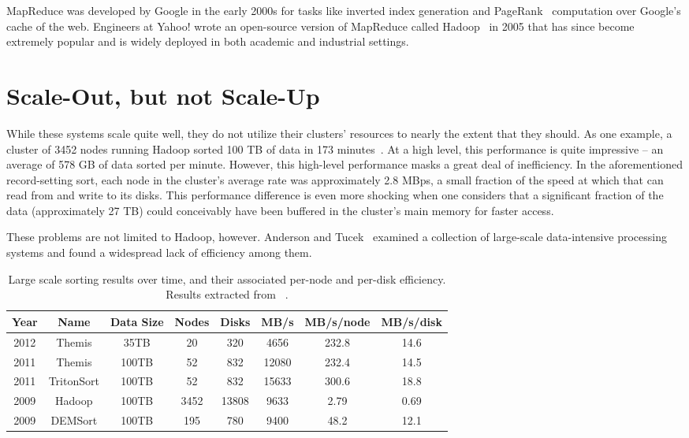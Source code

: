 MapReduce was developed by Google in the early 2000s for tasks like inverted
index generation and PageRank~\cite{pagerank} computation over Google's cache
of the web. Engineers at Yahoo! wrote an open-source version of MapReduce
called Hadoop~\cite{hadoop} in 2005 that has since become extremely popular and
is widely deployed in both academic and industrial settings.

\section{Scale-Out, but not Scale-Up}

While these systems scale quite well, they do not utilize their clusters'
resources to nearly the extent that they should. As one example, a cluster of
3452 nodes running Hadoop sorted 100 TB of data in 173
minutes~\cite{hadoop-sort-2009}. At a high level, this performance is quite
impressive -- an average of 578 GB of data sorted per minute. However, this
high-level performance masks a great deal of inefficiency. In the
aforementioned record-setting sort, each node in the cluster's average rate was
approximately 2.8 MBps, a small fraction of the speed at which that can read
from and write to its disks. This performance difference is even more shocking
when one considers that a significant fraction of the data (approximately 27
TB) could conceivably have been buffered in the cluster's main memory for
faster access.

These problems are not limited to Hadoop, however. Anderson and
Tucek~\cite{efficiency-matters} examined a collection of large-scale
data-intensive processing systems and found a widespread lack of efficiency
among them.

\begin{table}
\caption{\label{table:system-efficiency} Large scale sorting results over time,
  and their associated per-node and per-disk efficiency. Results extracted from
  ~\cite{efficiency-matters, hadoop-sort-2009, themis, tritonsort}.}

\begin{tabular}{|ccc|c|c|c|c|c|}
\hline
\textbf{Year} & \textbf{Name} & \textbf{Data Size} & \textbf{Nodes} & \textbf{Disks} & \textbf{MB/s} & \textbf{MB/s/node} & \textbf{MB/s/disk}\\
\hline
2012 & Themis & 35TB & 20 & 320 & 4656 & 232.8 & 14.6 \\
2011 & Themis & 100TB & 52 & 832 & 12080 & 232.4 & 14.5 \\
2011 & TritonSort & 100TB & 52 & 832  & 15633 & 300.6 & 18.8 \\
2009 & Hadoop & 100TB & 3452 & 13808 & 9633 & 2.79 & 0.69 \\
2009 & DEMSort & 100TB & 195 & 780 & 9400 & 48.2 & 12.1\\
\hline
\end{tabular}
\end{table}

